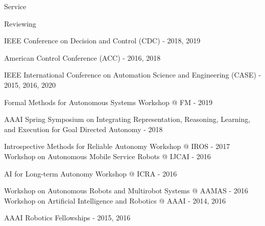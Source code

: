 \begin{rSection}{Service}
\begin{rSubsection}{Reviewing}{}{}{}
\item  IEEE Conference on Decision and Control (CDC) - 2018, 2019
\item  American Control Conference (ACC) - 2016, 2018
\item  IEEE International Conference on Automation Science and Engineering (CASE) - 2015, 2016, 2020
\item Formal Methods for Autonomous Systems Workshop @ FM - 2019
\item  AAAI Spring Symposium on Integrating Representation, Reasoning, Learning, and Execution for Goal Directed Autonomy - 2018
\item  Introspective Methods for Reliable Autonomy Workshop @ IROS - 2017 Workshop on Autonomous Mobile Service Robots @ IJCAI - 2016
\item  AI for Long-term Autonomy Workshop @ ICRA - 2016
\item  Workshop on Autonomous Robots and Multirobot Systems @ AAMAS - 2016 Workshop on Artificial Intelligence and Robotics @ AAAI - 2014, 2016
\item  AAAI Robotics Fellowships - 2015, 2016
\end{rSubsection}





\end{rSection}

